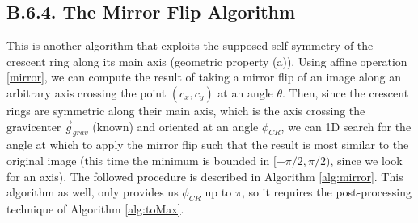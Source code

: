 \documentclass[11pt, a4paper, twoside]{article} %
\begin{document}
\vspace{-0.25cm}

\subsection*{B.6.4. The Mirror Flip Algorithm}\vspace{-0.15cm}
This is another algorithm that exploits the supposed self-symmetry of the crescent ring along its main axis (geometric property (a)). Using affine operation \eqref{mirror}, we can compute the result of taking a mirror flip of an image along an arbitrary axis crossing the point $(c_x,c_y)$ at an angle $\theta$. Then, since the crescent rings are symmetric along their main axis, which is the axis crossing the gravicenter $\vec{g}_{grav}$ (known) and oriented at an angle $\phi_{CR}$, we can 1D search for the angle at which to apply the mirror flip such that the result is most similar to the original image (this time the minimum is bounded in $[-\pi/2,\pi/2)$, since we look for an axis). The followed procedure is described in Algorithm \ref{alg:mirror}. This algorithm as well, only provides us $\phi_{CR}$ up to $\pi$, so it requires the post-processing technique of Algorithm \ref{alg:toMax}.
\end{document}
